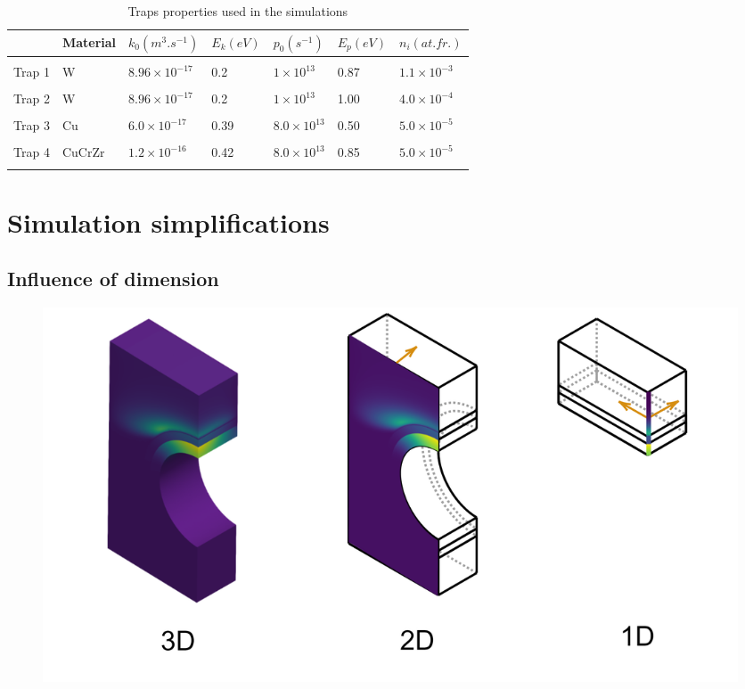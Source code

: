 \begin{table}
    \centering
    \begin{tabular}{L{1.5cm} L{1.5cm} R{1.7cm} R{1.1cm} R{1.6cm} R{1.1cm} R{1.9cm}}
         & Material & $k_0 (\si{m^3.s^{-1}})$ &  $E_k (\si{eV})$ & $p_0 (\si{s^{-1}})$ & $E_p (\si{eV})$ & $n_i (\si{at.fr.})$ \\
        \hline
        \\
        Trap 1 & W & $8.96 \times 10^{-17}$ & 0.2 & $1 \times 10^{13}$& 0.87 & $1.1 \times 10^{-3}$ \\
        \\
        Trap 2 & W & $8.96 \times 10^{-17}$ & 0.2 & $1 \times 10^{13}$& 1.00 & $4.0 \times 10^{-4}$ \\
        \\
        Trap 3 & Cu & $6.0 \times 10^{-17}$ & 0.39 & $8.0 \times 10^{13}$ & 0.50 &$5.0 \times 10^{-5}$\\
        \\
        Trap 4 & CuCrZr & $1.2\times 10^{-16}$ & 0.42 & $8.0 \times 10^{13}$ & 0.85 &$5.0 \times 10^{-5}$\\
        \\
    \end{tabular}
    \caption{Traps properties used in the simulations \cite{hodille_macroscopic_2015, dolan_assessment_1994}}
    \label{tab:traps monoblock}
\end{table}

\section{Simulation simplifications}
\subsection{Influence of dimension}
\begin{figure}
    \centering
    \includegraphics[width=\linewidth]{Figures/Chapter3/monoblocks/dimension_approximation.png}
    \caption{}
\end{figure}

